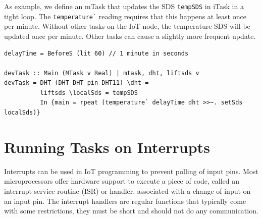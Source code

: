 \documentclass[runningheads]{llncs}
\newcommand{\CleanInline}[1]{\lstinline[language=Clean]!#1!}
\newcommand{\prog}[1]{\CleanInline{#1}}
\begin{document}
As example, we define an mTask that updates the SDS \prog{tempSDS} in iTask in a tight loop.
The \prog{temperature`} reading requires that this happens at least once per minute.
Without other tasks on the IoT node, the temperature SDS will be updated once per minute.
Other tasks can cause a slightly more frequent update.

\begin{lstlisting}[language=Clean,caption={Updating an SDS in iTask at most once per minute.},label={lst:updateSDS2}]
delayTime = BeforeS (lit 60) // 1 minute in seconds

devTask :: Main (MTask v Real) | mtask, dht, liftsds v
devTask = DHT (DHT_DHT pin DHT11) \dht =
          liftsds \localSds = tempSDS
          In {main = rpeat (temperature` delayTime dht >>~. setSds localSds)}
\end{lstlisting}





\section{Running Tasks on Interrupts}

Interrupts can be used in IoT programming to prevent polling of input pins.
Most microprocessors offer hardware support to execute a piece of code, called an interrupt service routine (ISR) or handler, associated with a change of input on an input pin.
The interrupt handlers are regular functions that typically come with some restrictions, they must be short and should not do any communication.
\end{document}
